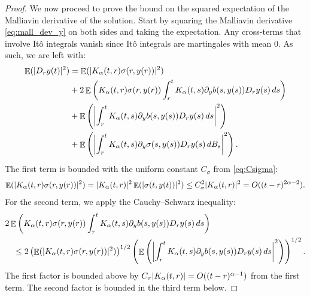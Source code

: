 \documentclass[11pt, a4paper]{article}
\theoremstyle{theoremstyle}
\theoremstyle{definitionstyle}
\newcommand{\dd}{\mathop{}\!d}
\DeclareMathOperator{\EE}{\mathbb E}
\DeclarePairedDelimiter{\abs}{\lvert}{\rvert}
\begin{document}
\begin{proof}
    We now proceed to prove the bound on the squared expectation of the Malliavin derivative of the solution. Start by squaring the Malliavin derivative \eqref{eq:mall_dev_y} on both sides and taking the expectation. Any cross-terms that involve It\^o integrals vanish since It\^o integrals are martingales with mean $0$. As such, we are left with:
    \begin{equation}
    \begin{aligned}
        \EE(\abs{D_ry(t)}^2) &= \EE (\abs{K_\alpha(t, r)\sigma(r, y(r))}^2) \\
        &+ 2\EE \left ( K_\alpha(t, r)\sigma(r, y(r))\int_r^t K_\alpha(t, s)\partial_yb(s, y(s))D_ry(s)\dd{s} \right ) \\
        &+ \EE \left ( \abs*{\int_r^t K_\alpha(t, s)\partial_yb(s, y(s))D_ry(s)\dd{s}}^2 \right ) \\
        &+ \EE \left ( \abs*{\int_r^t K_\alpha(t, s)\partial_y\sigma(s, y(s))D_ry(s)\dd{B_s}}^2 \right ).
    \end{aligned}
    \end{equation}
    The first term is bounded with the uniform constant $C_\sigma$ from \eqref{eq:Csigma}:
    \begin{equation}
        \EE (\abs{K_\alpha(t, r)\sigma(r, y(r))}^2) = \abs{K_\alpha(t, r)}^2 \EE (\abs{\sigma(t, y(t))}^2) \leq C_\sigma^2 \abs{K_\alpha(t, r)}^2 = O((t - r)^{2\alpha-2}).
    \end{equation}
    For the second term, we apply the Cauchy--Schwarz inequality:
    \begin{equation}
    \begin{aligned}
        &2\EE \left ( K_\alpha(t, r)\sigma(r, y(r))\int_r^t K_\alpha(t, s)\partial_yb(s, y(s))D_ry(s)\dd{s} \right ) \\
        &\quad \leq 2 \left ( \EE(\abs{K_\alpha(t, r)\sigma(r, y(r))}^2) \right )^{1/2} \left ( \EE \left ( \abs*{\int_r^t K_\alpha(t, s)\partial_yb(s, y(s))D_ry(s)\dd{s}}^2 \right ) \right )^{1/2}.
    \end{aligned}
    \end{equation}
    The first factor is bounded above by $C_\sigma \abs{K_\alpha(t, r)} = O((t - r)^{\alpha - 1})$ from the first term. The second factor is bounded in the third term below.
    

\end{proof}
\end{document}
